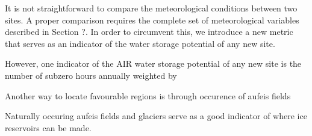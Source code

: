 It is not straightforward to compare the meteorological conditions between two sites. A proper comparison
requires the complete set of meteorological variables described in Section ?. In order to circumvent this, we
introduce a new metric that serves as an indicator of the water storage potential of any new site.

However, one indicator of the AIR water storage potential of any new site is the number of subzero hours
annually weighted by 

Another way to locate favourable regions is through occurence of aufeis fields

Naturally occuring aufeis fields and glaciers serve as a good indicator of where ice reservoirs can be made.
